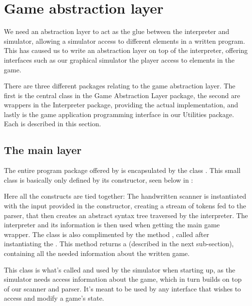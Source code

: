 \section{Game abstraction layer}
\label{sec:gameabstractionlayer}
We need an abstraction layer to act as the glue between the interpreter
and simulator, allowing a simulator access to different elements in a
written program. This has caused us to write an abstraction layer on top
of the interpreter, offering interfaces such as our graphical simulator
the player access to elements in the game.

There are three different packages relating to the game abstraction
layer. The first is the central class in the Game Abstraction Layer
package, the second are wrappers in the Interpreter package, providing
the actual implementation, and lastly is the game application
programming interface in our Utilities package. Each is described in
this section.

\subsection{The main layer}
The entire program package offered by \productname{} is encapsulated by
the class . This small class is basically
only defined by its constructor, seen below in :



Here all the constructs are tied together: The handwritten scanner
is instantiated with the input provided in the constructor, creating
a stream of tokens fed to the parser, that then creates an abstract
syntax tree traversed by the interpreter. The interpreter and its
information is then used when getting the main game wrapper. The class
is also complimented by the method , called after
instantiating the . This method returns a
 (described in the next sub-section), containing
all the needed information about the written game.

This class is what's called and used by the simulator when starting up,
as the simulator needs access information about the game, which in turn
builds on top of our scanner and parser. It's meant to be used by any
interface that wishes to access and modify a game's state.

